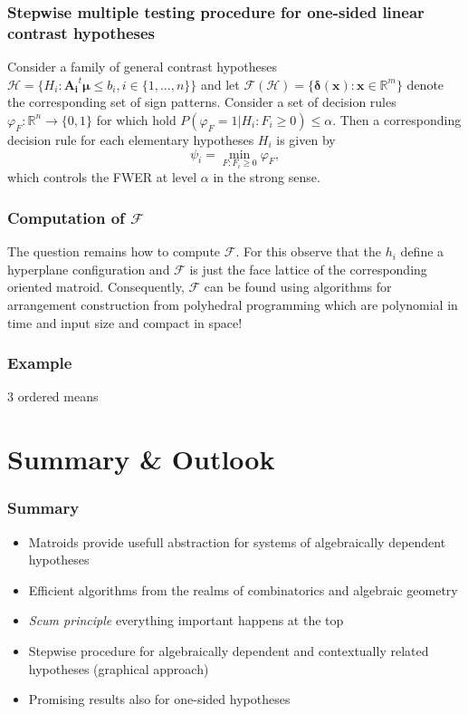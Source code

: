 \documentclass[bigger]{beamer}
\newcommand{\bs}[1]{\bm{#1}}
\newcommand{\R}{\mathbb{R}}
\begin{document}
\begin{frame}
 \frametitle{Stepwise multiple testing procedure for one-sided linear
   contrast hypotheses}

 Consider a family of general contrast hypotheses $\mathscr{H} =
 \{H_i: \bs{A_i}^t\bs{\mu} \leq b_i,i \in \{1,...,n\}\}$ and let
 $\mathscr{F}(\mathscr{H}) = \{ \bs{\delta}(\bs{x}): \bs{x} \in
 \R^m\}$ denote the corresponding set of sign patterns. Consider a
 set of decision rules $\varphi_F: \R^n \rightarrow \{0,1\}$ for
 which hold $P(\varphi_F = 1 | H_i: F_i \geq 0) \leq \alpha$. Then a
 corresponding decision rule for each elementary hypotheses $H_i$ is
 given by
 \begin{equation}
   \label{eq:signtest}
   \psi_i = \min_{F: F_i \geq 0} \varphi_F,
 \end{equation}
 which controls the FWER at level $\alpha$ in the strong sense.


\end{frame}


\begin{frame}
 \frametitle{Computation of $\mathscr{F}$}
 The question remains how to compute $\mathcal{F}$. For this observe
that the $h_i$ define a hyperplane configuration and $\mathcal{F}$ is
just the face lattice of the corresponding oriented
matroid. Consequently, $\mathcal{F}$ can be found using algorithms
for arrangement construction from polyhedral programming
\cite{Avis-KF-92,Avis-KF-96,Ferrez-KF-Liebling-01} which are
polynomial in time and input size and compact in space!

\end{frame}

\begin{frame}
 \frametitle{Example}
 3 ordered means
\end{frame}

\section{Summary \& Outlook}



\begin{frame}
\frametitle{Summary}
\begin{itemize}
\item Matroids provide usefull abstraction for systems of algebraically dependent hypotheses
\item Efficient algorithms from the realms of combinatorics and algebraic geometry
\item {\em Scum principle} everything important happens at the top
\item Stepwise procedure for algebraically dependent and contextually
  related hypotheses (graphical approach)
\item Promising results also for one-sided hypotheses
\end{itemize}
\end{frame}
\end{document}
